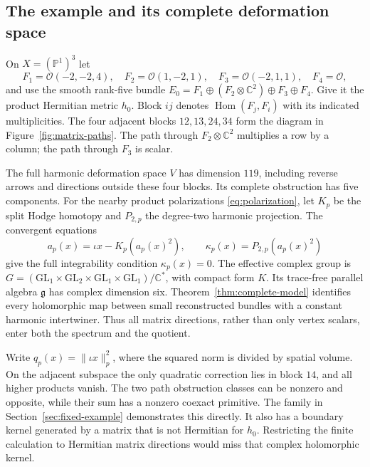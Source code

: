 \documentclass[11pt]{amsart}
\theoremstyle{definition}
\theoremstyle{remark}
\newcommand{\CC}{\mathbb C}
\newcommand{\PP}{\mathbb P}
\newcommand{\cO}{\mathcal O}
\newcommand{\Hom}{\operatorname{Hom}}
\begin{document}
\subsection{The example and its complete deformation space}
On $X=(\PP^1)^3$ let
\[
 F_1=\cO(-2,-2,4),\quad F_2=\cO(1,-2,1),\quad
 F_3=\cO(-2,1,1),\quad F_4=\cO,
\]
and use the smooth rank-five bundle
$E_0=F_1\oplus(F_2\otimes\CC^2)\oplus F_3\oplus F_4$.
Give it the product Hermitian metric $h_0$. Block $ij$ denotes
$\Hom(F_j,F_i)$ with its indicated multiplicities. The four
adjacent blocks $12,13,24,34$ form the diagram in Figure~\ref{fig:matrix-paths}.
The path through $F_2\otimes\CC^2$ multiplies a row by a column;
the path through $F_3$ is scalar.



The full harmonic deformation space $V$ has dimension $119$, including
reverse arrows and directions outside these four blocks. Its complete
obstruction has five components. For the nearby product polarizations
\eqref{eq:polarization}, let $K_p$ be the split Hodge homotopy and
$P_{2,p}$ the degree-two harmonic projection. The convergent equations
\[
 a_p(x)=\iota x-K_p(a_p(x)^2),\qquad
 \kappa_p(x)=P_{2,p}(a_p(x)^2)
\]
give the full integrability condition $\kappa_p(x)=0$.
The effective complex group is
$G=(\mathrm{GL}_1\times\mathrm{GL}_2\times\mathrm{GL}_1
\times\mathrm{GL}_1)/\CC^*$, with compact form $K$.
Its trace-free parallel algebra $\mathfrak g$ has complex dimension
six. Theorem~\ref{thm:complete-model} identifies every holomorphic
map between small reconstructed bundles with a constant harmonic
intertwiner. Thus all matrix directions, rather than only vertex
scalars, enter both the spectrum and the quotient.

Write $q_p(x)=\|\iota x\|_p^2$, where the squared norm is divided
by spatial volume. On the adjacent subspace the only quadratic
correction lies in block $14$, and all higher products vanish. The
two path obstruction classes can be nonzero and opposite, while their
sum has a nonzero coexact primitive. The family in
Section~\ref{sec:fixed-example} demonstrates this directly. It also
has a boundary kernel generated by a matrix that is not Hermitian
for $h_0$. Restricting the finite calculation to Hermitian matrix
directions would miss that complex holomorphic kernel.
\end{document}
